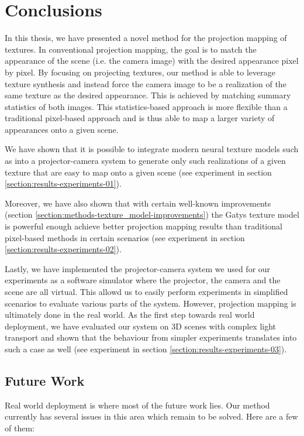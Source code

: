 \chapter{Conclusions}
\label{chapter:conclusions}

In this thesis, we have presented a novel method for the projection mapping of textures. In conventional projection mapping, the goal is to match the appearance of the scene (i.e. the camera image) with the desired appearance pixel by pixel. By focusing on projecting textures, our method is able to leverage texture synthesis and instead force the camera image to be a realization of the same texture as the desired appearance. This is achieved by matching summary statistics of both images. This statistics-based approach is more flexible than a traditional pixel-based approach and is thus able to map a larger variety of appearances onto a given scene.

We have shown that it is possible to integrate modern neural texture models such as \citet{Gatys2015} into a projector-camera system to generate only such realizations of a given texture that are easy to map onto a given scene (see experiment in section \ref{section:results-experiments-01}).

Moreover, we have also shown that with certain well-known improvements (section \ref{section:methods-texture_model-improvements}) the Gatys texture model is powerful enough achieve better projection mapping results than traditional pixel-based methods in certain scenarios (see experiment in section \ref{section:results-experiments-02}).

Lastly, we have implemented the projector-camera system we used for our experiments as a software simulator where the projector, the camera and the scene are all virtual. This allowd us to easily perform experiments in simplified scenarios to evaluate various parts of the system. However, projection mapping is ultimately done in the real world. As the first step towards real world deployment, we have evaluated our system on 3D scenes with complex light transport and shown that the behaviour from simpler experiments translates into such a case as well (see experiment in section \ref{section:results-experiments-03}).

\section{Future Work}
\label{section:conclusions-future_work}

Real world deployment is where most of the future work lies. Our method currently has several issues in this area which remain to be solved. Here are a few of them:

